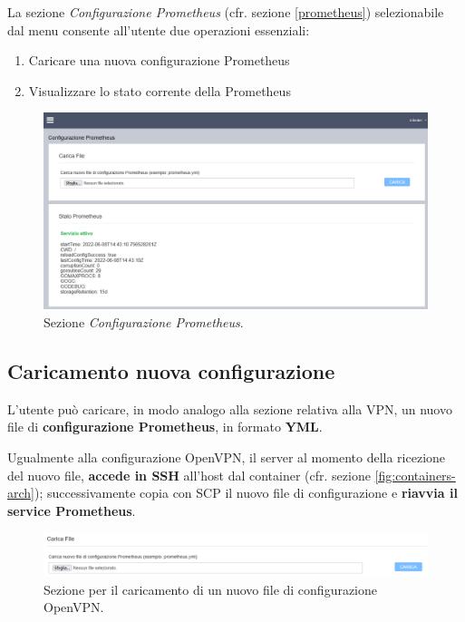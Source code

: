 La sezione \emph{Configurazione Prometheus} (cfr. sezione \ref{prometheus}) selezionabile dal menu consente all'utente due operazioni essenziali:

\begin{enumerate}
    \item Caricare una nuova configurazione Prometheus
    \item Visualizzare lo stato corrente della Prometheus
\end{enumerate}

\begin{figure}[H]
    \begin{center}
    \includegraphics[width=\textwidth]{images/full-prometheus.png}
    \caption{Sezione \emph{Configurazione Prometheus}.}
    \end{center}
\end{figure}

\subsection{Caricamento nuova configurazione}

L'utente può caricare, in modo analogo alla sezione relativa alla VPN, un nuovo file di \textbf{configurazione Prometheus}, in formato \textbf{YML}. 

Ugualmente alla configurazione OpenVPN, il server al momento della ricezione del nuovo file, \textbf{accede in SSH} all'host dal container (cfr. sezione \ref{fig:containers-arch}); successivamente copia con SCP il nuovo file di configurazione e \textbf{riavvia il service Prometheus}.

\begin{figure}[H]
    \begin{center}
    \includegraphics[width=\textwidth]{images/prometheus-file.png}
    \caption{Sezione per il caricamento di un nuovo file di configurazione OpenVPN.}
    \end{center}
\end{figure}

